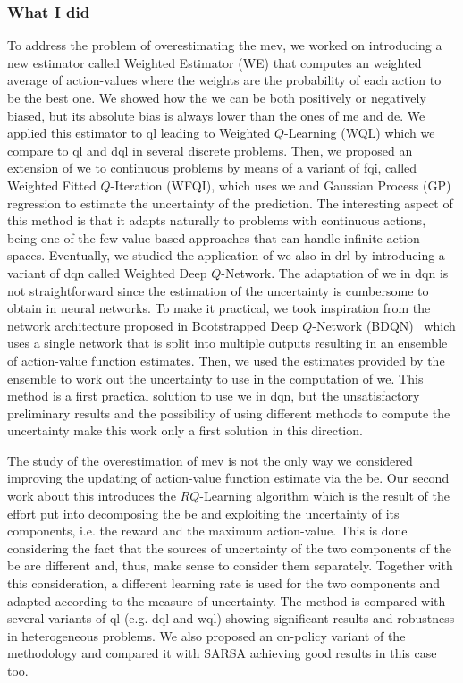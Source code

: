 \subsubsection{What I did}
To address the problem of overestimating the \gls{mev}, we worked on introducing a new estimator called Weighted Estimator (WE) that computes an weighted average of action-values where the weights are the probability of each action to be the best one. We showed how the \gls{we} can be both positively or negatively biased, but its absolute bias is always lower than the ones of \gls{me} and \gls{de}. We applied this estimator to \gls{ql} leading to Weighted $Q$-Learning (WQL) which we compare to \gls{ql} and \gls{dql} in several discrete problems. Then, we proposed an extension of \gls{we} to continuous problems by means of a variant of \gls{fqi}, called Weighted Fitted $Q$-Iteration (WFQI), which uses \gls{we} and Gaussian Process (GP) regression to estimate the uncertainty of the prediction. The interesting aspect of this method is that it adapts naturally to problems with continuous actions, being one of the few value-based approaches that can handle infinite action spaces. Eventually, we studied the application of \gls{we} also in \gls{drl} by introducing a variant of \gls{dqn} called Weighted Deep $Q$-Network. The adaptation of \gls{we} in \gls{dqn} is not straightforward since the estimation of the uncertainty is cumbersome to obtain in neural networks. To make it practical, we took inspiration from the network architecture proposed in Bootstrapped Deep $Q$-Network (BDQN)~\cite{osband2017deep} which uses a single network that is split into multiple outputs resulting in an ensemble of action-value function estimates. Then, we used the estimates provided by the ensemble to work out the uncertainty to use in the computation of \gls{we}. This method is a first practical solution to use \gls{we} in \gls{dqn}, but the unsatisfactory preliminary results and the possibility of using different methods to compute the uncertainty make this work only a first solution in this direction.

The study of the overestimation of \gls{mev} is not the only way we considered improving the updating of action-value function estimate via the \gls{be}. Our second work about this introduces the $RQ$-Learning algorithm which is the result of the effort put into decomposing the \gls{be} and exploiting the uncertainty of its components, i.e. the reward and the maximum action-value. This is done considering the fact that the sources of uncertainty of the two components of the \gls{be} are different and, thus, make sense to consider them separately. Together with this consideration, a different learning rate is used for the two components and adapted according to the measure of uncertainty. The method is compared with several variants of \gls{ql} (e.g. \gls{dql} and \gls{wql}) showing significant results and robustness in heterogeneous problems. We also proposed an on-policy variant of the methodology and compared it with SARSA achieving good results in this case too.

